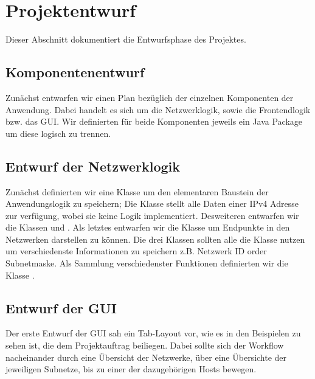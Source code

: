 \section{Projektentwurf}
Dieser Abschnitt dokumentiert die Entwurfsphase des Projektes.

\subsection{Komponentenentwurf}
Zunächst entwarfen wir einen Plan bezüglich der einzelnen Komponenten der Anwendung.
Dabei handelt es sich um die Netzwerklogik, sowie die Frontendlogik bzw. das GUI.
Wir definierten für beide Komponenten jeweils ein Java Package um diese logisch zu trennen.

\subsection{Entwurf der Netzwerklogik}
Zunächst definierten wir eine Klasse um den elementaren Baustein der Anwendungslogik zu speichern;
Die Klasse  stellt alle Daten einer IPv4 Adresse zur verfügung,
wobei sie keine Logik implementiert. Desweiteren entwarfen wir die Klassen  und .
Als letztes entwarfen wir die Klasse  um Endpunkte in den Netzwerken darstellen zu können.
Die drei Klassen sollten alle die Klasse  nutzen um verschiedenste Informationen
zu speichern z.B. Netzwerk ID order Subnetmaske.
Als Sammlung verschiedenster Funktionen definierten wir die Klasse .

\subsection{Entwurf der GUI}
Der erste Entwurf der GUI sah ein Tab-Layout vor, wie es in den Beispielen zu sehen ist,
die dem Projektauftrag beiliegen. Dabei sollte sich der Workflow nacheinander durch eine
Übersicht der Netzwerke, über eine Übersichte der jeweiligen Subnetze, bis zu einer der
dazugehörigen Hosts bewegen.